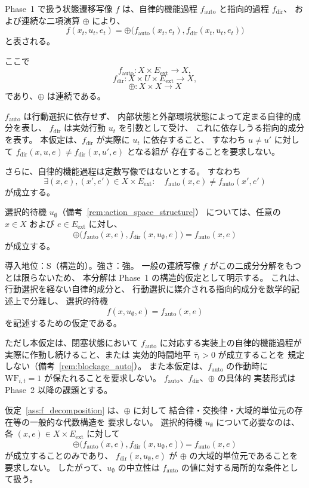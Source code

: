 \begin{assumption}[状態遷移の二成分分解]
\label{ass:f_decomposition}
Phase~1 で扱う状態遷移写像 $f$ は、自律的機能過程
$f_{\mathrm{auto}}$ と指向的過程 $f_{\mathrm{dir}}$、
および連続な二項演算 $\oplus$ により、
\[
  f(x_t,u_t,e_t)
  =
  \oplus\bigl(
    f_{\mathrm{auto}}(x_t,e_t),
    f_{\mathrm{dir}}(x_t,u_t,e_t)
  \bigr)
\]
と表される。

ここで
\[
  f_{\mathrm{auto}}:X\times E_{\mathrm{ext}}\to X,
\]
\[
  f_{\mathrm{dir}}:X\times U\times E_{\mathrm{ext}}\to X,
\]
\[
  \oplus:X\times X\to X
\]
であり、$\oplus$ は連続である。

$f_{\mathrm{auto}}$ は行動選択に依存せず、
内部状態と外部環境状態によって定まる自律的成分を表し、
$f_{\mathrm{dir}}$ は実効行動 $u_t$ を引数として受け、
これに依存しうる指向的成分を表す。
本仮定は、$f_{\mathrm{dir}}$ が実際に $u_t$ に依存すること、
すなわち $u\neq u'$ に対して
$f_{\mathrm{dir}}(x,u,e)\neq f_{\mathrm{dir}}(x,u',e)$ となる組が
存在することを要求しない。

さらに、自律的機能過程は定数写像ではないとする。
すなわち
\[
  \exists (x,e),(x',e')\in X\times E_{\mathrm{ext}}:
  \quad
  f_{\mathrm{auto}}(x,e)\neq f_{\mathrm{auto}}(x',e')
\]
が成立する。

選択的待機 $u_{\emptyset}$（備考~\ref{rem:action_space_structure}）
については、任意の $x\in X$ および
$e\in E_{\mathrm{ext}}$ に対し、
\[
  \oplus\bigl(
    f_{\mathrm{auto}}(x,e),
    f_{\mathrm{dir}}(x,u_{\emptyset},e)
  \bigr)
  =
  f_{\mathrm{auto}}(x,e)
\]
が成立する。

\medskip
\noindent
導入地位：S（構造的）。強さ：強。
一般の連続写像 $f$ がこの二成分分解をもつとは限らないため、
本分解は Phase~1 の構造的仮定として明示する。
これは、行動選択を経ない自律的成分と、
行動選択に媒介される指向的成分を数学的記述上で分離し、
選択的待機
\[
  f(x,u_{\emptyset},e)
  =
  f_{\mathrm{auto}}(x,e)
\]
を記述するための仮定である。

ただし本仮定は、閉塞状態において
$f_{\mathrm{auto}}$ に対応する実装上の自律的機能過程が
実際に作動し続けること、または
実効的時間地平 $\widehat{\tau}_{t}>0$ が成立することを
規定しない（備考~\ref{rem:blockage_auto}）。
また本仮定は、$f_{\mathrm{auto}}$ の作動時に
$\mathrm{WF}_{i,t}=1$ が保たれることを要求しない。
$f_{\mathrm{auto}}$、$f_{\mathrm{dir}}$、$\oplus$ の具体的
実装形式は Phase~2 以降の課題とする。
\end{assumption}

\begin{remark}
\label{rem:oplus_neutrality}
仮定~\ref{ass:f_decomposition} は、$\oplus$ に対して
結合律・交換律・大域的単位元の存在等の一般的な代数構造を
要求しない。
選択的待機 $u_{\emptyset}$ について必要なのは、
各 $(x,e)\in X\times E_{\mathrm{ext}}$ に対して
\[
  \oplus\bigl(
    f_{\mathrm{auto}}(x,e),
    f_{\mathrm{dir}}(x,u_{\emptyset},e)
  \bigr)
  =
  f_{\mathrm{auto}}(x,e)
\]
が成立することのみであり、
$f_{\mathrm{dir}}(x,u_{\emptyset},e)$ が
$\oplus$ の大域的単位元であることを要求しない。
したがって、$u_{\emptyset}$ の中立性は
$f_{\mathrm{auto}}$ の値に対する局所的な条件として扱う。
\end{remark}

